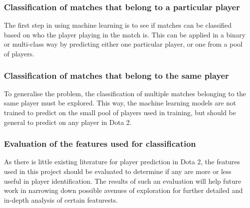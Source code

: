\documentclass[Report.tex]{subfiles}
\begin{document}
\subsubsection{Classification of matches that belong to a particular player}
The first step in using machine learning is to see if matches can be classified based on who the player playing in the match is. This can be applied in a binary or multi-class way by predicting either one particular player, or one from a pool of players. 

\subsubsection{Classification of matches that belong to the same player}
To generalise the problem, the classification of multiple matches belonging to the same player must be explored. This way, the machine learning models are not trained to predict on the small pool of players used in training, but should be general to predict on any player in Dota 2. 

\subsubsection{Evaluation of the features used for classification}
As there is little existing literature for player prediction in Dota 2, the features used in this project should be evaluated to determine if any are more or less useful in player identification. The results of such an evaluation will help future work in narrowing down possible avenues of exploration for further detailed and in-depth analysis of certain featurests. 





\end{document}
